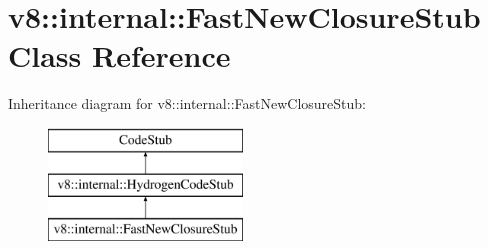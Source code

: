 \hypertarget{classv8_1_1internal_1_1_fast_new_closure_stub}{}\section{v8\+:\+:internal\+:\+:Fast\+New\+Closure\+Stub Class Reference}
\label{classv8_1_1internal_1_1_fast_new_closure_stub}
Inheritance diagram for v8\+:\+:internal\+:\+:Fast\+New\+Closure\+Stub\+:\begin{figure}[H]
\begin{center}
\leavevmode
\includegraphics[height=3.000000cm]{classv8_1_1internal_1_1_fast_new_closure_stub}
\end{center}
\end{figure}
